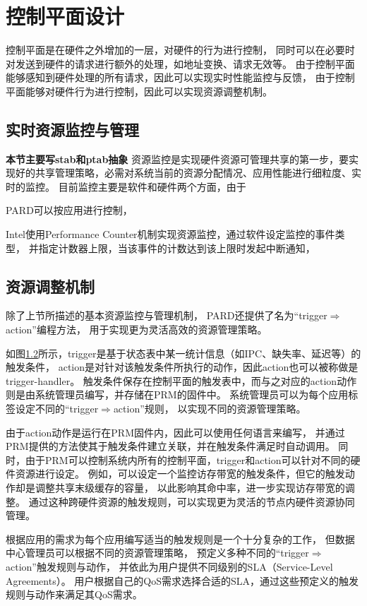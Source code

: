 \section{控制平面设计}

控制平面是在硬件之外增加的一层，对硬件的行为进行控制，
同时可以在必要时对发送到硬件的请求进行额外的处理，如地址变换、请求无效等。
由于控制平面能够感知到硬件处理的所有请求，因此可以实现实时性能监控与反馈，
由于控制平面能够对硬件行为进行控制，因此可以实现资源调整机制。

\subsection{实时资源监控与管理}
\textbf{本节主要写stab和ptab抽象}
资源监控是实现硬件资源可管理共享的第一步，要实现好的共享管理策略，必需对系统当前的资源分配情况、应用性能进行细粒度、实时的监控。
目前监控主要是软件和硬件两个方面，由于

PARD可以按应用进行控制，

Intel使用Performance Counter机制实现资源监控，通过软件设定监控的事件类型，
并指定计数器上限，当该事件的计数达到该上限时发起中断通知，


\subsection{资源调整机制}

除了上节所描述的基本资源监控与管理机制，
PARD还提供了名为``trigger$\Rightarrow$action''编程方法，
用于实现更为灵活高效的资源管理策略。

如图\ref{}所示，trigger是基于状态表中某一统计信息（如IPC、缺失率、延迟等）的触发条件，
action是对针对该触发条件所执行的动作，因此action也可以被称做是trigger-handler。
触发条件保存在控制平面的触发表中，而与之对应的action动作则是由系统管理员编写，并存储在PRM的固件中。
系统管理员可以为每个应用标签设定不同的``trigger$\Rightarrow$action''规则，
以实现不同的资源管理策略。

由于action动作是运行在PRM固件内，因此可以使用任何语言来编写，
并通过PRM提供的方法使其于触发条件建立关联，并在触发条件满足时自动调用。
同时，由于PRM可以控制系统内所有的控制平面，trigger和action可以针对不同的硬件资源进行设定。
例如，可以设定一个监控访存带宽的触发条件，但它的触发动作却是调整共享末级缓存的容量，
以此影响其命中率，进一步实现访存带宽的调整。
通过这种跨硬件资源的触发规则，可以实现更为灵活的节点内硬件资源协同管理。

根据应用的需求为每个应用编写适当的触发规则是一个十分复杂的工作，
但数据中心管理员可以根据不同的资源管理策略，
预定义多种不同的``trigger$\Rightarrow$action''触发规则与动作，
并依此为用户提供不同级别的SLA（Service-Level Agreements）。
用户根据自己的QoS需求选择合适的SLA，通过这些预定义的触发规则与动作来满足其QoS需求。

